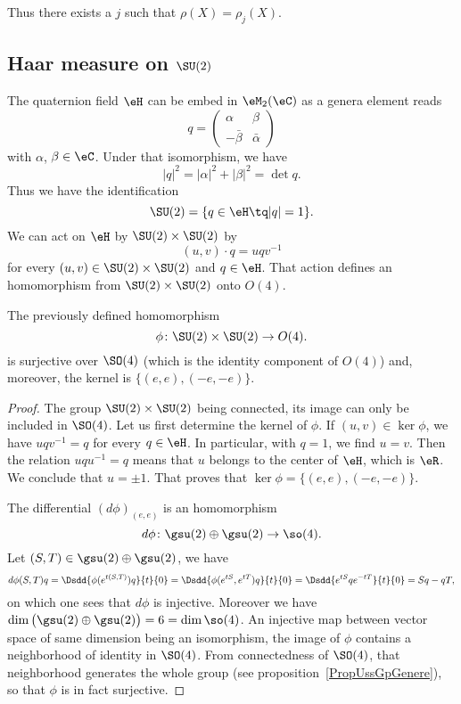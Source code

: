 Thus there exists a \( j\) such that \( \rho(X)=\rho_j(X)\).

					\subsection{Haar measure on \texorpdfstring{$\SU(2)$}{SU2}}

The quaternion field $\eH$ can be embed in $\eM_2(\eC)$ as a genera element reads
\begin{equation}
	q=
\begin{pmatrix}
  \alpha	&	\beta	\\
  -\bar\beta	&	\bar\alpha
\end{pmatrix}
\end{equation}
with $\alpha$, $\beta\in\eC$. Under that isomorphism, we have
\[
	| q |^2=| \alpha |^2+| \beta |^2=\det q.
\]
Thus we have the identification
\begin{equation}
	\SU(2)=\{ q\in\eH\tq | q |=1 \}.
\end{equation}
We can act on $\eH$ by $\SU(2)\times \SU(2)$ by
\begin{equation}
	(u,v)\cdot q=uqv^{-1}
\end{equation}
for every $(u,v)\in \SU(2)\times\SU(2)$ and $q\in\eH$. That action defines an homomorphism from $\SU(2)\times\SU(2)$ onto $O(4)$.

\begin{proposition}
The previously defined homomorphism
\[
	\phi\colon \SU(2)\times\SU(2)\to O(4).
\]
is surjective over $\SO(4)$ (which is the identity component of $O(4)$) and, moreover, the kernel is $\big\{  (e,e),(-e,-e) \big\}$.
\end{proposition}

\begin{proof}
The group $\SU(2)\times \SU(2)$ being connected, its image can only be included in $\SO(4)$. Let us first determine the kernel of $\phi$. If $(u,v)\in\ker\phi$, we have $uqv^{-1}=q$ for every $q\in\eH$. In particular, with $q=1$, we find $u=v$. Then the relation $uqu^{-1}=q$ means that $u$ belongs to the center of $\eH$, which is $\eR$. We conclude that $u=\pm 1$. That proves that $\ker\phi=\big\{  (e,e),(-e,-e) \big\}$.

The differential $(d\phi)_{(e,e)}$ is an homomorphism
\[
	d\phi\colon \gsu(2)\oplus\gsu(2)\to \so(4).
\]
Let $(S,T)\in\gsu(2)\oplus\gsu(2)$, we have
\[
	d\phi(S,T)q=\Dsdd{ \phi( e^{t(S,T)})q }{t}{0}=\Dsdd{ \phi( e^{tS}, e^{tT})q }{t}{0}=\Dsdd{  e^{tS}q e^{-tT} }{t}{0}=Sq-qT,
\]
on which one sees that $d\phi$ is injective. Moreover we have $\dim\big( \gsu(2)\oplus\gsu(2) \big)=6=\dim\so(4)$. An injective map between vector space of same dimension being an isomorphism, the image of $\phi$ contains a neighborhood of identity in $\SO(4)$. From connectedness of $\SO(4)$, that neighborhood generates the whole group (see proposition~\ref{PropUssGpGenere}), so that $\phi$ is in fact surjective.
\end{proof}

